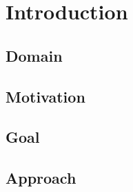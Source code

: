 \chapter{Introduction}
\label{introduction}

\section{Domain} 
\label{domain}


\section{Motivation} 
\label{motivation}


\section{Goal}
\label{goal}


\section{Approach}
\label{approach}

